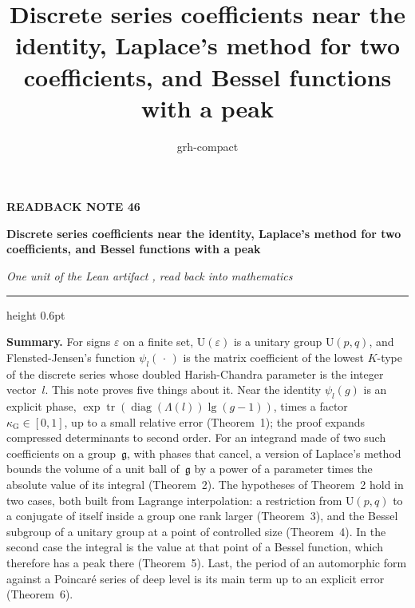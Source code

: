 \documentclass[11pt,a4paper]{article}
\title{Discrete series coefficients near the identity, Laplace's method for two coefficients, and Bessel functions with a peak}
\author{grh-compact}
\date{}
\theoremstyle{plainx}
\theoremstyle{uprightx}
\newcommand{\tr}{\operatorname{tr}}
\newcommand{\Us}[1]{\mathrm{U}(#1)}                      %
\newcommand{\lgo}[1]{\operatorname{lg}(#1)}              %
\newcommand{\dg}[1]{\operatorname{diag}(#1)}             %
\newcommand{\lowk}[1]{\Lambda(#1)}                       %
\newcommand{\dsc}[2]{\psi_{#1}(#2)}                      %
\begin{document}
\color{ink}

{\raggedright
{\sffamily\bfseries\fontsize{7.2}{9}\selectfont\color{leancol}READBACK NOTE 46\par}
\vspace{5pt}
{\fontsize{21.5}{25.5}\selectfont\bfseries Discrete series coefficients near the identity, Laplace's method for two coefficients, and Bessel functions with a peak\par}
\vspace{5pt}
{\fontsize{12.4}{16}\selectfont\itshape\color{inksoft} One unit of the Lean artifact \ArtifactName, read back into
mathematics\par}}
\vspace{8pt}
{\color{rulegrey}\hrule height 0.6pt}
\vspace{7pt}
\thispagestyle{empty}


\textbf{Summary.} For signs $\varepsilon$ on a finite set, $\Us{\varepsilon}$ is a unitary group $\mathrm{U}(p,q)$, and
Flensted-Jensen's function $\dsc{l}{\,\cdot\,}$ is the matrix coefficient of the lowest $K$-type of the discrete
series whose doubled Harish-Chandra parameter is the integer vector~$l$. This note proves five things about it.
Near the identity $\dsc{l}{g}$ is an explicit phase, $\exp\tr(\dg{\lowk{l}}\lgo{g-1})$, times a factor
$\kappa_{\mathrm{G}}\in[0,1]$, up to a small relative error (Theorem~1); the proof expands compressed determinants to second
order. For an integrand made of two such coefficients on a group~$\mathfrak{g}$, with phases that cancel, a version of
Laplace's method bounds the volume of a unit ball of~$\mathfrak{g}$ by a power of a parameter times the absolute value of its integral
(Theorem~2). The hypotheses of Theorem~2 hold in two cases, both built from Lagrange interpolation: a restriction
from $\mathrm{U}(p,q)$ to a conjugate of itself inside a group one rank larger (Theorem~3), and the Bessel subgroup of
a unitary group at a point of controlled size (Theorem~4). In the second case the integral is the value at
that point of a Bessel function, which therefore has a peak there (Theorem~5). Last, the period of an automorphic form
against a Poincaré series of deep level is its main term up to an explicit error (Theorem~6).
\end{document}
